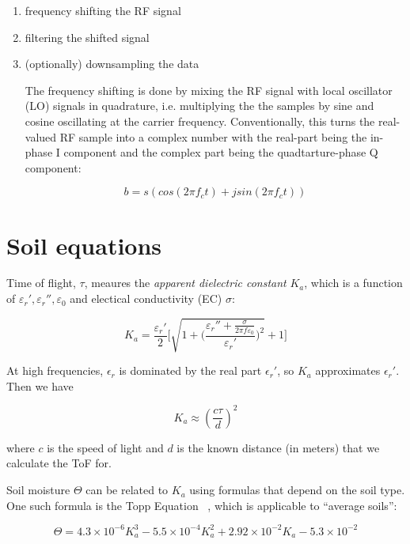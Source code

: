 \documentclass[12pt]{article}
\begin{document}
\begin{enumerate}
\item frequency shifting the RF signal
\item filtering the shifted signal
\item (optionally) downsampling the data 

The frequency shifting is done by mixing the RF signal with local
oscillator (LO) signals in quadrature, i.e. multiplying the the
samples by sine and cosine oscillating at the carrier
frequency. Conventionally, this turns the real-valued RF sample into a
complex number with the real-part being the in-phase I component and
the complex part being the quadtarture-phase Q component:

\begin{equation*}
b = s(cos(2\pi f_c t)+ jsin(2 \pi f_c t)) 
\end{equation*}

\end{enumerate}


\section*{Soil equations}
Time of flight, $\tau$, meaures the \emph{apparent dielectric
  constant} $K_a$, which is a function of
$\varepsilon_r', \varepsilon_r'', \varepsilon_0$ and electical conductivity (EC)
$\sigma$:

\begin{equation}
  K_a = \frac{\varepsilon_r'}{2}\Bigg[\sqrt{1+\bigg(\frac{\varepsilon_r'' + \frac{\sigma}{2\pi f\varepsilon_0}}{\varepsilon_r'}\bigg)^2}+1\Bigg]  
\end{equation}

At high frequencies, $\epsilon_r$ is dominated by the real part
$\epsilon_r'$, so $K_a$ approximates $\epsilon_r'$. Then we have

\begin{equation}
K_a \approx (\frac{c\tau}{d})^2
\end{equation}

where $c$ is the speed of light and $d$ is the known distance (in
meters) that we calculate the ToF for.

Soil moisture $\Theta$ can be related to $K_a$ using formulas that depend on the soil type. One such formula is the Topp Equation ~\cite{Topp1980}, which is applicable to ``average soils'':

\begin{equation}
  \Theta = 4.3\times 10^{-6}K_a^3-5.5\times10^{-4}K_a^2+2.92\times 10^{-2}K_a-5.3\times 10^{-2}
\end{equation}
\end{document}
